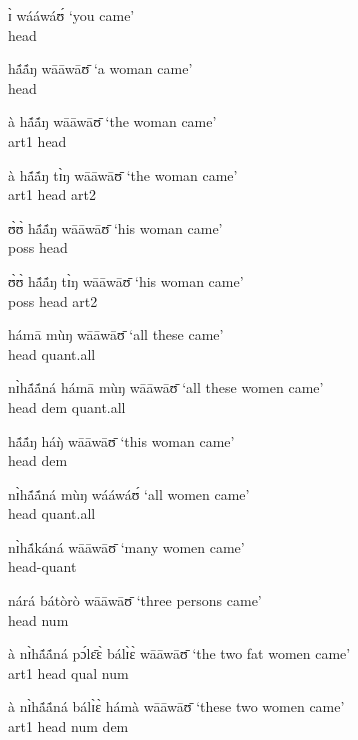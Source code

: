 \begin{exe}
\begin{exe}
\begin{exe}
\begin{exe}
\begin{exe}
\begin{exe}
\begin{exe}
\begin{exe}
\begin{exe}
\begin{exe}
\begin{exe}
  \ea\label{ex:GRM-pro} 
ɪ̀   wááwáʊ́ {\rm `you came'}\\{\sc head} 

  \ex\label{ex:GRM-h} 
hã́ã́ŋ wāāwāʊ̄ {\rm  `a woman came'}\\
{\sc head} 

  \ex\label{ex:GRM-ah} 
à hã́ã́ŋ  wāāwāʊ̄ {\rm  `the woman came'}\\
{\sc art1} {\sc head} 

  \ex\label{ex:GRM-aha}
  à hã́ã́ŋ tɪ̀ŋ wāāwāʊ̄  {\rm  `the woman came'}\\
{\sc art1} {\sc head} {\sc art2}

  \ex\label{ex:GRM-ph} 
ʊ̀ʊ̀ hã́ã́ŋ   wāāwāʊ̄  {\rm  `his woman came'}\\
 {\sc poss}  {\sc head}

  \ex\label{ex:GRM-pha} 
ʊ̀ʊ̀  hã́ã́ŋ tɪ̀ŋ   wāāwāʊ̄  {\rm  `his woman came'}\\
 {\sc poss} {\sc head} {\sc art2}  

 \ex\label{ex:GRM-dhq}
hámā mùŋ  wāāwāʊ̄ {\rm   `all these  came'}\\
{\sc head} {\sc quant}{\rm .all}

 \ex\label{ex:GRM-hdq}
 nɪ̀hã́ã́ná hámā mùŋ  wāāwāʊ̄ {\rm  `all these women  came'}\\
  {\sc head} {\sc dem} {\sc quant}{\rm .all} 

  \ex\label{ex:GRM-hd} 
hã́ã́ŋ háŋ̀    wāāwāʊ̄ {\rm  `this woman  came'}\\
  {\sc head} {\sc dem}  

  \ex\label{ex:GRM-hq-all} 
 nɪ̀hã́ã́ná  mùŋ wááwáʊ́ {\rm  `all women  came'}\\
{\sc head} {\sc quant}{\rm .all}

\ex\label{ex:GRM-hq-many} 
 nɪ̀hã́káná    wāāwāʊ̄  {\rm  `many women  came'}\\
{\sc head-quant}  

  \ex\label{ex:GRM-hn} 
nárá bátòrò wāāwāʊ̄ {\rm  `three persons  came'}\\
  {\sc head} {\sc num}  

  \ex\label{ex:GRM-ahqln} 
à nɪ̀hã́ã́ná pɔ́lɛ̄ɛ̀ bálɪ̀ɛ̀   wāāwāʊ̄  {\rm  `the two fat women  came'}\\
 {\sc art1} {\sc head} {\sc qual} {\sc num}  

  \ex\label{ex:GRM-ahqlnd}
  à nɪ̀hã́ã́ná bálɪ̀ɛ̀ hámà wāāwāʊ̄    {\rm  `these two women  came'}\\
 {\sc art1} {\sc head} {\sc num} {\sc dem}  


\end{exe}
\end{exe}
\end{exe}
\end{exe}
\end{exe}
\end{exe}
\end{exe}
\end{exe}
\end{exe}
\end{exe}
\end{exe}
